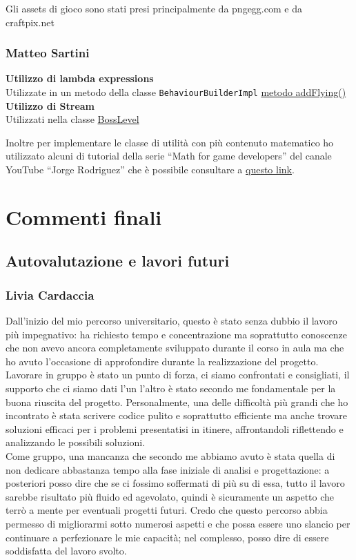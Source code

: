 \documentclass[a4paper,12pt]{report}
\begin{document}
Gli assets di gioco sono stati presi principalmente da pngegg.com e da craftpix.net

\subsection{Matteo Sartini}
\textbf{Utilizzo di lambda expressions}\\
Utilizzate in un metodo della classe \texttt{BehaviourBuilderImpl}
\href{https://github.com/dennnanni/UNIBOssfight/blob/1f248b375d7cf6e1bf10144a9acbacf9b59ca3b5/UNIBOSSfight/src/main/java/app/impl/builder/BehaviourBuilderImpl.java#L79}{metodo addFlying()}
\textbf{Utilizzo di Stream}\\
Utilizzati nella classe \href{https://github.com/dennnanni/UNIBOssfight/blob/1f248b375d7cf6e1bf10144a9acbacf9b59ca3b5/UNIBOSSfight/src/main/java/app/impl/level/BossLevel.java#L19}{BossLevel}


Inoltre per implementare le classe di utilità con più contenuto matematico ho utilizzato alcuni di tutorial della serie “Math for game developers” del canale YouTube “Jorge Rodriguez” che è possibile consultare a \href{https://www.youtube.com/playlist?list=PLW3Zl3wyJwWOpdhYedlD-yCB7WQoHf-My}{questo link}.

\large
\newpage
\chapter{Commenti finali}
\section{Autovalutazione e lavori futuri}
\subsection{Livia Cardaccia}
Dall'inizio del mio percorso universitario, questo è stato senza dubbio il lavoro più impegnativo: ha richiesto tempo e concentrazione ma soprattutto conoscenze che non avevo ancora completamente sviluppato durante il corso in aula ma che ho avuto l'occasione di approfondire durante la realizzazione del progetto. Lavorare in gruppo è stato un punto di forza, ci siamo confrontati e consigliati, il supporto che ci siamo dati l'un l'altro è stato secondo me fondamentale per la buona riuscita del progetto. Personalmente, una delle difficoltà più grandi che ho incontrato è stata scrivere codice pulito e soprattutto efficiente ma anche trovare soluzioni efficaci per i problemi presentatisi in itinere, affrontandoli riflettendo e analizzando le possibili soluzioni.\\
Come gruppo, una mancanza che secondo me abbiamo avuto è stata quella di non dedicare abbastanza tempo alla fase iniziale di analisi e progettazione: a posteriori posso dire che se ci fossimo soffermati di più su di essa, tutto il lavoro sarebbe risultato più fluido ed agevolato, quindi è sicuramente un aspetto che terrò a mente per eventuali progetti futuri.
Credo che questo percorso abbia permesso di migliorarmi sotto numerosi aspetti e che possa essere uno slancio per continuare a perfezionare le mie capacità; nel complesso, posso dire di essere soddisfatta del lavoro svolto.
\end{document}
